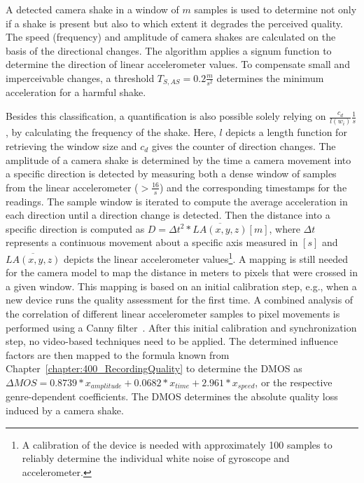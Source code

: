 A detected camera shake in a window of $m$ samples is used to determine not only if a shake is present but also to which extent it degrades the perceived quality.
The speed (frequency) and amplitude of camera shakes are calculated on the basis of the directional changes.
The algorithm applies a signum function to determine the direction of linear accelerometer values. 
To compensate small and imperceivable changes, a threshold $T_{S,AS}= 0.2\frac{\unit{m}}{s^2}$ determines the minimum acceleration for a harmful shake. 

Besides this classification, a quantification is also possible solely relying on $\frac{c_{d}}{l(w_{i})} \unit{\frac{1}{s}}$, by calculating the frequency of the shake.
Here, $l$ depicts a length function for retrieving the window size and $c_{d}$ gives the counter of direction changes. 
The amplitude of a camera shake is determined by the time a camera movement into a specific direction is detected by measuring both a dense window of samples from the linear accelerometer ($> \frac{16}{s}$) and the corresponding timestamps for the readings.
The sample window is iterated to compute the average acceleration in each direction until a direction change is detected.
Then the distance into a specific direction is computed as $D = \Delta t^2 * \overline{LA(x,y,z)} [\unit{m}] $, where $\Delta t$ represents a continuous movement about a specific axis measured in $[\unit{s}]$ and $\overline{LA(x,y,z)}$ depicts the linear accelerometer values\footnote{A calibration of the device is needed with approximately 100 samples to reliably determine the individual white noise of gyroscope and accelerometer.}.
A mapping is still needed for the camera model to map the distance in meters to pixels that were crossed in a given window.
This mapping is based on an initial calibration step, e.g., when a new device runs the quality assessment for the first time. 
A combined analysis of the correlation of different linear accelerometer samples to pixel movements is performed using a Canny filter~\cite{Canny1986}.
After this initial calibration and synchronization step, no video-based techniques need to be applied.
The determined influence factors are then mapped to the formula known from Chapter~\ref{chapter:400_RecordingQuality} to determine the \ac{DMOS} as
$\Delta MOS = 0.8739 * x_{amplitude} + 0.0682  * x_{time} + 2.961 * x_{speed}$, or the respective genre-dependent coefficients. 
The \ac{DMOS} determines the absolute quality loss induced by a camera shake. 
